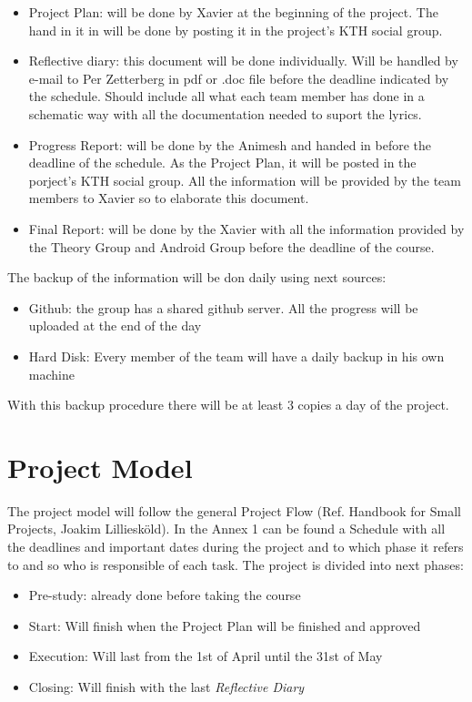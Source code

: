 \documentclass[11pt]{article}
\begin{document}
\begin{itemize}
\item Project Plan: will be done by Xavier at the beginning of the project. The hand in it in will be done by posting it in the project's KTH social group.

\item Reflective diary: this document will be done individually. Will be handled by e-mail to Per Zetterberg in pdf or .doc file before the deadline indicated by the schedule. Should include all what each team member has done in a schematic way with all the documentation needed to suport the lyrics.

\item Progress Report: will be done by the Animesh and handed in before the deadline of the schedule. As the Project Plan, it will be posted in the porject's KTH social group.  All the information will be provided by the team members to Xavier so to elaborate this document.

\item Final Report: will be done by the Xavier with all the information provided by the Theory Group and Android Group before the deadline of the course.
\end{itemize}


The backup of the information will be don daily using next sources:

\begin{itemize}
\item Github: the group has a shared github server. All the progress will be uploaded at the end of the day
\item Hard Disk: Every member of the team will have a daily backup in his own machine
\end{itemize}

With this backup procedure there will be at least 3 copies a day of the project.

\section{Project Model}

The project model will follow the general Project Flow (Ref. Handbook for Small Projects, Joakim Lilliesköld). In the Annex 1 can be found a Schedule with all the deadlines and important dates during the project and to which phase it refers to and so who is responsible of each task. The project is divided into next phases:

\begin{itemize}
\item Pre-study: already done before taking the course
\item Start: Will finish when the Project Plan will be finished and approved
\item Execution: Will last from the 1st of April until the 31st of May
\item Closing: Will finish with the last \textit{Reflective Diary}
\end{itemize}
\end{document}
